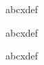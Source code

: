\documentclass{article}
\begin{document}

abcx\tfBack{}def

abcx\tfBack{}def

abc{x}def
\end{document}
